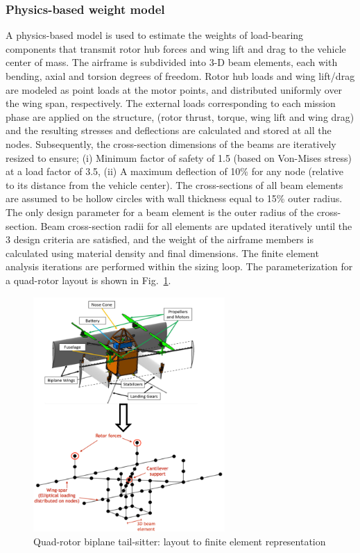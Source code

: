 \subsubsection{Physics-based weight model}
A physics-based model is used to estimate the weights of load-bearing components that transmit rotor hub forces and wing lift and drag to the vehicle center of mass. The airframe is subdivided into 3-D beam elements, each with bending, axial and torsion degrees of freedom. Rotor hub loads and wing lift/drag are modeled as point loads at the motor points, and distributed uniformly over the wing span, respectively. The external loads corresponding to each mission phase are applied on the structure,  (rotor thrust, torque, wing lift and wing drag) and the resulting stresses and deflections are calculated and stored at all the nodes. Subsequently, the cross-section dimensions of the beams are iteratively resized to ensure; (i) Minimum factor of safety of 1.5 (based on Von-Mises stress) at a load factor of 3.5, (ii) A maximum deflection of 10\% for any node (relative to its distance from the vehicle center). The cross-sections of all beam elements are assumed to be hollow circles with wall thickness equal to 15\% outer radius. The only design parameter for a beam element is the outer radius of the cross-section. Beam cross-section radii for all elements are updated iteratively until the 3 design criteria are satisfied, and the weight of the airframe members is calculated using material density and final dimensions. The finite element analysis iterations are performed within the sizing loop. The parameterization for a quad-rotor layout is shown in Fig.~\ref{fig:airframe}.

\begin{figure}
\begin{center}
\includegraphics[width=0.65\textwidth]{images/airframe.png}
\vspace{-0.1cm}
\caption{Quad-rotor biplane tail-sitter: layout to finite element representation}
\label{fig:airframe}
\end{center}
\end{figure}

